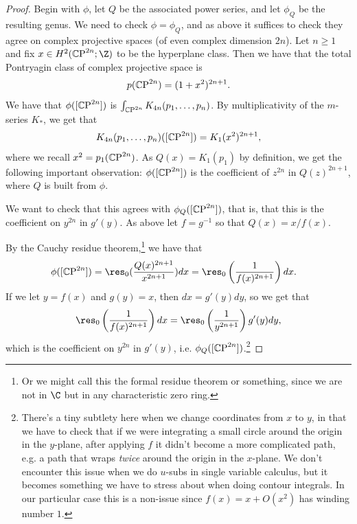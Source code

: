 \documentclass[11pt]{book}
\begin{document}
\begin{proof} Begin with $\phi$, let $Q$ be the associated power series, and let $\phi_Q$ be the resulting genus. We need to check $\phi = \phi_Q$, and as above it suffices to check they agree on complex projective spaces (of even complex dimension $2n$). Let $n\ge1$ and fix $x\in H^2(\CP^{2n};\Z)$ to be the hyperplane class. Then we have that the total Pontryagin class of complex projective space is
\begin{align*}
    p({\mathbb{C}\text{P}}^{2n}) = (1+x^2)^{2n+1}.
\end{align*}
We have that $\phi([{\mathbb{C}\text{P}}^{2n}])$ is $\int_{{\mathbb{C}\text{P}}^{2n}} K_{4n}(p_1, \ldots, p_n)$. By multiplicativity of the $m$-series $K_\ast$, we get that
\begin{align*}
    K_{4n}(p_1, \ldots, p_n)([{\mathbb{C}\text{P}}^{2n}]) = K_1(x^2)^{2n+1},
\end{align*}
where we recall $x^2 = p_1({\mathbb{C}\text{P}}^{2n})$. As $Q(x) = K_1(p_1)$ by definition, we get the following important observation: $\phi([{\mathbb{C}\text{P}}^{2n}])$ is the coefficient of $z^{2n}$ in $Q(z)^{2n+1}$, where $Q$ is built from $\phi$.

We want to check that this agrees with $\phi_Q([{\mathbb{C}\text{P}}^{2n}])$, that is, that this is the coefficient on $y^{2n}$ in $g'(y)$. As above let $f = g^{-1}$ so that $Q(x) = x/f(x)$.

By the Cauchy residue theorem,\footnote{Or we might call this the formal residue theorem or something, since we are not in $\C$ but in any characteristic zero ring.} we have that
\begin{align*}
    \phi([\CP^{2n}]) &= \res_0(\frac{Q(x)^{2n+1}}{x^{2n+1}})dx = \res_0 \left( \frac{1}{f(x)^{2n+1}} \right)dx.
\end{align*}
If we let $y=f(x)$ and $g(y)=x$, then $dx = g'(y)dy$, so we get that
\begin{align*}
    \res_0 \left( \frac{1}{f(x)^{2n+1}} \right)dx = \res_0 \left( \frac{1}{y^{2n+1}} \right)g'(y)dy,
\end{align*}
which is the coefficient on $y^{2n}$ in $g'(y)$, i.e. $\phi_Q([{\mathbb{C}\text{P}}^{2n}])$.\footnote{There's a tiny subtlety here when we change coordinates from $x$ to $y$, in that we have to check that if we were integrating a small circle around the origin in the $y$-plane, after applying $f$ it didn't become a more complicated path, e.g. a path that wraps \emph{twice} around the origin in the $x$-plane. We don't encounter this issue when we do $u$-subs in single variable calculus, but it becomes something we have to stress about when doing contour integrals. In our particular case this is a non-issue since $f(x) = x + O(x^2)$ has winding number $1$.}
\end{proof}
\end{document}
